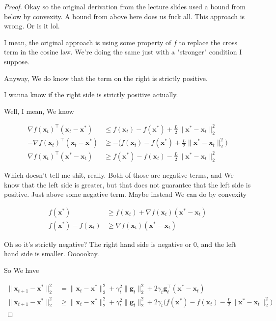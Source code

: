 \documentclass{article}
\begin{document}
\begin{proof}
	Okay so the original derivation from the lecture slides used a bound from below by convexity. A bound from above here does us fuck all. This approach is wrong. Or is it lol.
	
	I mean, the original approach is using some property of $f$ to replace the cross term in the cosine law. We're doing the same just with a "stronger" condition I suppose. 
	
	Anyway, We do know that the term on the right is strictly positive. 
	
	I wanna know if  the right side is strictly positive actually. 
	
	Well, I mean, We know 
	
	\begin{align}
		\nabla f(\mathbf{x}_t)^\top (\mathbf{x}_t - \mathbf{x}^*) &\le f(\mathbf{x}_t) - f(\mathbf{x}^*)  + \frac{L}{2}\|\mathbf{x}^*-\mathbf{x}_t\|^2_2\\
		-\nabla f(\mathbf{x}_t)^\top (\mathbf{x}_t - \mathbf{x}^*) &\ge -\big( f(\mathbf{x}_t) - f(\mathbf{x}^*)  + \frac{L}{2}\|\mathbf{x}^*-\mathbf{x}_t\|^2_2 \big)\\
		\nabla f(\mathbf{x}_t)^\top ( \mathbf{x}^* - \mathbf{x}_t ) &\ge  f(\mathbf{x}^*)- f(\mathbf{x}_t)   - \frac{L}{2}\|\mathbf{x}^*-\mathbf{x}_t\|^2_2 
	\end{align}
	
	Which doesn't tell me shit, really. Both of those are negative terms, and We know that the left side is greater, but that does not guarantee that the left side is positive. Just above some negative term. Maybe instead We can do by convexity
	
	\begin{align}
		f(\mathbf{x}^*) &\ge f(\mathbf{x}_t) + \nabla f(\mathbf{x}_t)(\mathbf{x}^*-\mathbf{x}_t)\\
		f(\mathbf{x}^*) - f(\mathbf{x}_t) &\ge   \nabla f(\mathbf{x}_t)(\mathbf{x}^*-\mathbf{x}_t)
	\end{align}
	
	Oh so it's strictly negative? The right hand side is negative or 0, and the left hand side is smaller. Oooookay.
	
	So We have
	
	\begin{align}
		\| \mathbf{x}_{t+1} - \mathbf{x}^*\|^2_2  &= \|\mathbf{x}_t-\mathbf{x}^*\|^2_2 + \gamma_t^2\| \mathbf{g}_t\|^2_2 + 2\gamma_t \mathbf{g}_t^\top (\mathbf{x}^* - \mathbf{x}_t)\\
		\| \mathbf{x}_{t+1} - \mathbf{x}^*\|^2_2  &\ge \|\mathbf{x}_t-\mathbf{x}^*\|^2_2 + \gamma_t^2\| \mathbf{g}_t\|^2_2 + 2\gamma_t \big(f(\mathbf{x}^*)- f(\mathbf{x}_t)   - \frac{L}{2}\|\mathbf{x}^*-\mathbf{x}_t\|^2_2 \big)
	\end{align}
	

\end{proof}
\end{document}
